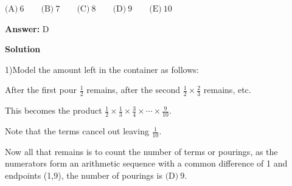 \begin{enumerate}
 $\text{(A)}\ 6 \qquad \text{(B)}\ 7 \qquad \text{(C)}\ 8 \qquad \text{(D)}\ 9 \qquad \text{(E)}\ 10$

 \textbf{Answer: }D



\textbf{Solution}

1)Model the amount left in the container as follows:

 After the first pour $\frac12$ remains, after the second $\frac12 \times \frac23$ remains, etc.

 This becomes the product $\frac12 \times \frac13 \times \frac34 \times \cdots \times \frac{9}{10}$.

 Note that the terms cancel out leaving $\frac{1}{10}$.

 Now all that remains is to count the number of terms or pourings, as the numerators form an arithmetic sequence with a common difference of 1 and endpoints (1,9), the number of pourings is $\boxed{\text{(D)}\ 9}$.

 


\end{enumerate}